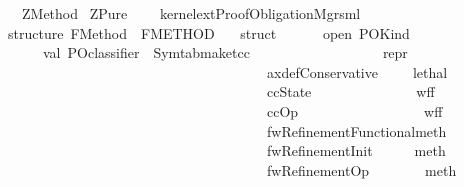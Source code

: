 %
\begin{isabellebody}%
\def\isabellecontext{ZMethod}%
%
\isamarkuptrue%
%
\isadelimtheory
%
\endisadelimtheory
%
\isatagtheory
{}\isamarkupfalse%
\ \ ZMethod\isanewline
{}\ ZPure\isanewline
{}\ \ \ \ {\isachardoublequoteopen}kernel{\isacharunderscore}ext{\isacharslash}ProofObligationMgr{\isachardot}sml{\isachardoublequoteclose}\ \isanewline
{}%
\endisatagtheory
{\isafoldtheory}%
%
\isadelimtheory
%
\endisadelimtheory
%
\isamarkuptrue%
%
\isadelimML
%
\endisadelimML
%
\isatagML
{}\isamarkupfalse%
{\isacharverbatimopen}\ \isanewline
\isanewline
structure\ FMethod\ {\isacharparenleft}{\isacharasterisk}{\isacharcolon}\ FMETHOD{\isacharasterisk}{\isacharparenright}\ {\isacharequal}\isanewline
\ \ struct\ \isanewline
\ \ \ \ \ open\ POKind\ \ \ \ \isanewline
\isanewline
\ \ \ \ \ val\ PO{\isacharunderscore}classifier\ {\isacharequal}\ Symtab{\isachardot}make{\isacharbrackleft}{\isacharparenleft}{\isachardoublequote}tcc{\isachardoublequote}{\isacharcomma}\ \ \ \ \ \ \ \ \ \ \ \ \ \ \ \ \ \ \ repr{\isacharparenright}{\isacharcomma}\isanewline
\ \ \ \ \ \ \ \ \ \ \ \ \ \ \ \ \ \ \ \ \ \ \ \ \ \ \ \ \ \ \ \ \ \ \ \ \ {\isacharparenleft}{\isachardoublequote}axdefConservative{\isachardoublequote}{\isacharcomma}\ \ \ \ \ lethal{\isacharparenright}{\isacharcomma}\isanewline
\ \ \ \ \ \ \ \ \ \ \ \ \ \ \ \ \ \ \ \ \ \ \ \ \ \ \ \ \ \ \ \ \ \ \ \ \ {\isacharparenleft}{\isachardoublequote}ccState{\isachardoublequote}{\isacharcomma}\ \ \ \ \ \ \ \ \ \ \ \ \ \ \ wff{\isacharparenright}{\isacharcomma}\ \isanewline
\ \ \ \ \ \ \ \ \ \ \ \ \ \ \ \ \ \ \ \ \ \ \ \ \ \ \ \ \ \ \ \ \ \ \ \ \ {\isacharparenleft}{\isachardoublequote}ccOp{\isachardoublequote}{\isacharcomma}\ \ \ \ \ \ \ \ \ \ \ \ \ \ \ \ \ \ wff{\isacharparenright}{\isacharcomma}\ \isanewline
\ \ \ \ \ \ \ \ \ \ \ \ \ \ \ \ \ \ \ \ \ \ \ \ \ \ \ \ \ \ \ \ \ \ \ \ \ {\isacharparenleft}{\isachardoublequote}fwRefinementFunctional{\isachardoublequote}{\isacharcomma}meth{\isacharparenright}{\isacharcomma}\isanewline
\ \ \ \ \ \ \ \ \ \ \ \ \ \ \ \ \ \ \ \ \ \ \ \ \ \ \ \ \ \ \ \ \ \ \ \ \ {\isacharparenleft}{\isachardoublequote}fwRefinementInit{\isachardoublequote}{\isacharcomma}\ \ \ \ \ \ meth{\isacharparenright}{\isacharcomma}\isanewline
\ \ \ \ \ \ \ \ \ \ \ \ \ \ \ \ \ \ \ \ \ \ \ \ \ \ \ \ \ \ \ \ \ \ \ \ \ {\isacharparenleft}{\isachardoublequote}fwRefinementOp{\isachardoublequote}{\isacharcomma}\ \ \ \ \ \ \ \ meth{\isacharparenright}{\isacharbrackright}\isanewline

\end{isabellebody}
